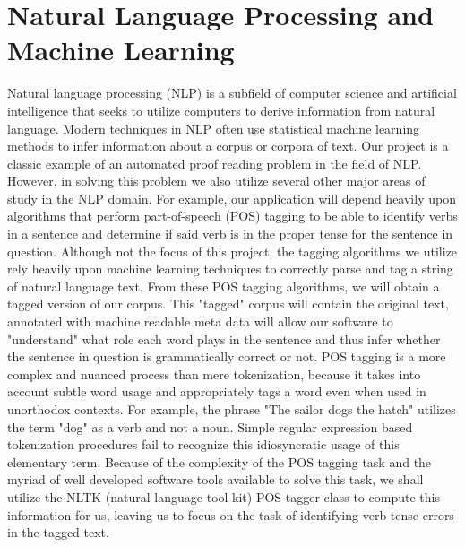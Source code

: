 \documentclass{article}
\begin{document}
\section{Natural Language Processing and Machine Learning}
Natural language processing (NLP) is a subfield of computer science and artificial intelligence that seeks to utilize computers to derive information from natural language. Modern techniques in NLP often use statistical machine learning methods to infer information about a corpus or corpora of text. Our project is a classic example of an automated proof reading problem in the field of NLP. However, in solving this problem we also utilize several other major areas of study in the NLP domain. For example, our application will depend heavily upon algorithms that perform part-of-speech (POS) tagging to be able to identify verbs in a sentence and determine if said verb is in the proper tense for the sentence in question. 
Although not the focus of this project, the tagging algorithms we utilize rely heavily upon machine learning techniques \citep{NLPML} to correctly parse and tag a string of natural language text. From these POS tagging algorithms, we will obtain a tagged version of our corpus. This "tagged" corpus will contain the original text, annotated with machine readable meta data will allow our software to "understand" what role each word plays in the sentence and thus infer whether the sentence in question is grammatically correct or not. POS tagging is a more complex and nuanced process than mere tokenization, because it takes into account subtle word usage and appropriately tags a word even when used in unorthodox contexts. For example, the phrase "The sailor dogs the hatch" utilizes the term "dog" as a verb and not a noun. Simple regular expression based tokenization procedures fail to recognize this idiosyncratic usage of this elementary term. Because of the complexity of the POS tagging task and the myriad of well developed software tools available to solve this task, we shall utilize the NLTK (natural language tool kit) POS-tagger class to compute this information for us, leaving us to focus on the task of identifying verb tense errors in the tagged text. 
\end{document}

